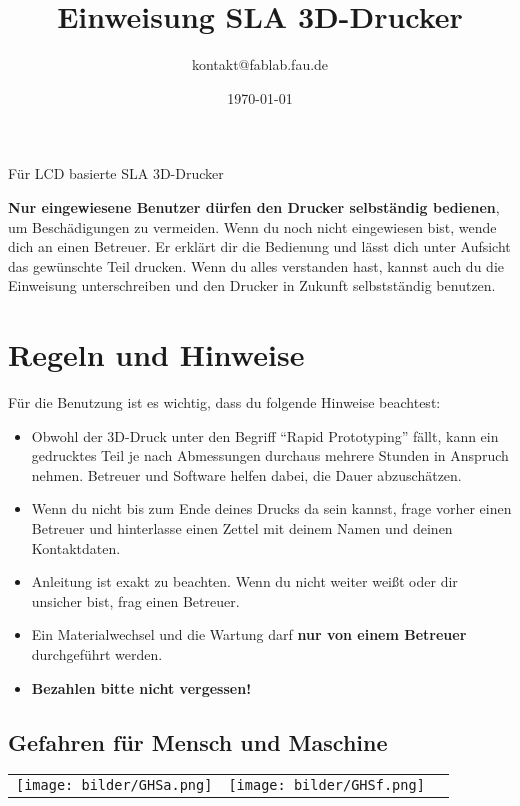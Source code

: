 \documentclass{\basedir/fablab-document}
\date{\today}
\author{kontakt@fablab.fau.de}
\title{Einweisung SLA 3D-Drucker}
\begin{document}
\maketitle
\begin{center}
    Für LCD basierte SLA 3D-Drucker
\end{center}

\textbf{Nur eingewiesene Benutzer dürfen den Drucker selbständig bedienen}, um Beschädigungen zu vermeiden. Wenn du noch nicht eingewiesen bist, wende dich an einen Betreuer. Er erklärt dir die Bedienung und lässt dich unter Aufsicht das gewünschte Teil drucken. Wenn du alles verstanden hast, kannst auch du die Einweisung unterschreiben und den Drucker in Zukunft selbstständig benutzen.

\renewcommand{\contentsname}{Inhaltsverzeichnis / Arbeitsablauf}
\setcounter{tocdepth}{2}
\tableofcontents
\newpage

\section{Regeln und Hinweise}
Für die Benutzung ist es wichtig, dass du folgende Hinweise beachtest:

\begin{itemize}
    \item Obwohl der 3D-Druck unter den Begriff \enquote{Rapid Prototyping} fällt, kann ein gedrucktes Teil je nach Abmessungen durchaus mehrere Stunden in Anspruch nehmen. Betreuer und Software helfen dabei, die Dauer abzuschätzen.
    \item Wenn du nicht bis zum Ende deines Drucks da sein kannst, frage vorher einen Betreuer und hinterlasse einen Zettel mit deinem Namen und deinen Kontaktdaten.
    \item Anleitung ist exakt zu beachten. Wenn du nicht weiter weißt oder dir unsicher bist, frag einen Betreuer.
    \item Ein Materialwechsel und die Wartung darf \textbf{nur von einem Betreuer} durchgeführt werden.
    \item \textbf{Bezahlen bitte nicht vergessen!}
\end{itemize}
\subsection{Gefahren für Mensch und Maschine}
\begin{table}[h]
    \centering
    \begin{tabular}{ccc}

        \texttt{[image: bilder/GHSa.png]}  & \texttt{[image: bilder/GHSf.png]}
    \end{tabular}
\end{table}
\end{document}
